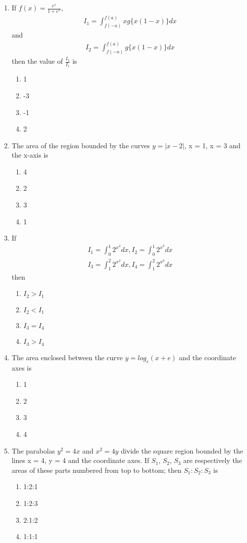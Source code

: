 \begin{enumerate}[label=\arabic*.,ref=\thesubsection.\theenumi]
\item If $f(x) = \frac{e^x}{1 + e^x}$,
\begin{align*}
I_1 = \int_{f(-a)}^{f(a)}xg\{x(1-x)\}dx
\end{align*}
and
\begin{align*}
I_2 = \int_{f(-a)}^{f(a)}g\{x(1-x)\}dx
\end{align*}
then the value of $\frac{I_2}{I_1}$ is
\begin{enumerate}
\item 1
\item -3
\item -1
\item 2
\end{enumerate}

\item The area of the region bounded by the curves $y = |x - 2|$, x = 1, x = 3 and the x-axis is
\begin{enumerate}
\item 4
\item 2
\item 3
\item 1
\end{enumerate}

\item If 
\begin{align*}
I_1 = \int_{0}^{1}2^{x^2}dx, I_2 = \int_{0}^{1}2^{x^3}dx
\end{align*}
\begin{align*}
I_3 = \int_{1}^{2}2^{x^2}dx, I_4 = \int_{1}^{2}2^{x^3}dx
\end{align*}
then
\begin{enumerate}
\item $I_2 > I_1$
\item $I_2 < I_1$
\item $I_3 = I_4$
\item $I_3 > I_4$
\end{enumerate}

\item The area enclosed between the curve $y = log_e(x + e)$ and the coordinate axes is
\begin{enumerate}
\item 1
\item 2
\item 3
\item 4
\end{enumerate}

\item The parabolas $y^2 = 4x$ and $x^2 = 4y$ divide the square region bounded by the lines x = 4, y = 4 and the coordinate axes. If $S_1$, $S_2$, $S_3$ are respectively the areas of these parts numbered from top to bottom; then 
$S_1:S_2:S_3$ is
\begin{enumerate}
\item 1:2:1
\item 1:2:3
\item 2:1:2
\item 1:1:1
\end{enumerate}


\end{enumerate}
